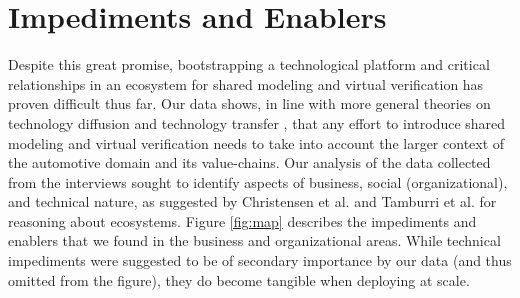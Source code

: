 \section{Impediments and Enablers}\label{sec:impediments_and_enablers}

Despite this great promise, bootstrapping a technological platform and critical relationships in an ecosystem for shared modeling and virtual verification has proven difficult thus far.
Our data shows, in line with more general theories on technology diffusion \cite{rogers2010diffusion} %
and technology transfer \cite{gorschek2006model}, that any effort to introduce shared modeling and virtual verification needs to take into account the larger context of the automotive domain and its value-chains. 
Our analysis of the data collected from the interviews sought to identify aspects of business, social (organizational), and technical nature, as suggested by Christensen et al. \cite{christensen2014analysis} and Tamburri et al. \cite{tamburri2013uncovering} for reasoning about ecosystems. 
Figure \ref{fig:map} describes the impediments and enablers that we found in the business and organizational areas. 
While technical impediments were suggested to be of secondary importance by our data (and thus omitted from the figure), they do become %
{tangible} when deploying at scale.





